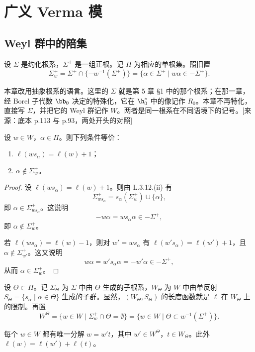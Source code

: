 \chapter{广义 Verma 模}
\label{ch:06.6}

\section{Weyl 群中的陪集}
\label{sec:06.6.1}

设 $\Sigma$ 是约化根系，$\Sigma^+$ 是一组正根。记 $\Pi$ 为相应的单根集。照旧置
$$\Sigma^+_w=\Sigma^+\cap\{-w^{-1}(\Sigma^+)\}=\{\alpha\in\Sigma^+\mid w\alpha\in-\Sigma^+\}.$$
\begin{annote}
本章改用抽象根系的语言。这里的 $\Sigma$ 就是第 5 章 §1 中的那个根系；在那一章，经 Borel 子代数 $\bb_0$ 决定的特殊化，它在 $\h_0^*$ 中的像记作 $R_0$。本章不再特化，直接写 $\Sigma$，并把它的 Weyl 群记作 $W$。两者是同一根系在不同语境下的记号。[来源：底本 p.113 与 p.93，两处开头的对照]
\end{annote}

\begin{lemma}\label{lem:06.1.1}
设 $w\in W$，$\alpha\in\Pi$。则下列条件等价：
\begin{enumerate}[label=(\roman*)]
\item $\ell(ws_\alpha)=\ell(w)+1$；
\item $\alpha\notin\Sigma^+_w$。
\end{enumerate}
\end{lemma}

\begin{proof}
设 $\ell(ws_\alpha)=\ell(w)+1$。则由 L.3.12.(ii) 有
$$\Sigma^+_{ws_\alpha}=s_\alpha(\Sigma^+_w)\cup\{\alpha\},$$
即 $\alpha\in\Sigma^+_{ws_\alpha}$。这说明
$$-w\alpha=ws_\alpha\alpha\in-\Sigma^+,$$
即 $\alpha\notin\Sigma^+_w$。

若 $\ell(ws_\alpha)=\ell(w)-1$，则对 $w'=ws_\alpha$ 有 $\ell(w's_\alpha)=\ell(w')+1$，且 $\alpha\notin\Sigma^+_{w'}$。这又说明
$$w\alpha=w's_\alpha\alpha=-w'\alpha\in-\Sigma^+,$$
从而 $\alpha\in\Sigma^+_w$。
\end{proof}

设 $\Theta\subset\Pi$。记 $\Sigma_\Theta$ 为 $\Sigma$ 中由 $\Theta$ 生成的子根系，$W_\Theta$ 为 $W$ 中由单反射 $S_\Theta=\{s_\alpha\mid\alpha\in\Theta\}$ 生成的子群。显然，$(W_\Theta,S_\Theta)$ 的长度函数就是 $\ell$ 在 $W_\Theta$ 上的限制。再置
$$W^\Theta=\{w\in W\mid\Sigma^+_w\cap\Theta=\emptyset\}=\{w\in W\mid\Theta\subset w^{-1}(\Sigma^+)\}.$$

\begin{theorem}\label{thm:06.1.2}
每个 $w\in W$ 都有唯一分解 $w=w't$，其中 $w'\in W^\Theta$，$t\in W_\Theta$。此外 $\ell(w)=\ell(w')+\ell(t)$。
\end{theorem}

